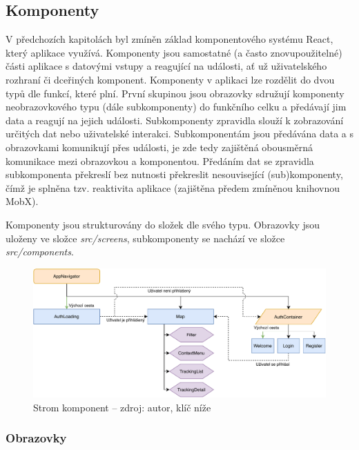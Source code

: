 \subsection{Komponenty}

V předchozích kapitolách byl zmíněn základ komponentového systému React, který aplikace využívá. Komponenty jsou samostatné (a často znovupoužitelné) části aplikace s datovými vstupy a reagující na události, ať už uživatelského rozhraní či dceřiných komponent. Komponenty v aplikaci lze rozdělit do dvou typů dle funkcí, které plní. První skupinou jsou obrazovky sdružují komponenty neobrazovkového typu (dále subkomponenty) do funkčního celku a předávají jim data a reagují na jejich události. Subkomponenty zpravidla slouží k zobrazování určitých dat nebo uživatelské interakci. Subkomponentám jsou předávána data a s obrazovkami komunikují přes události, je zde tedy zajištěná obousměrná komunikace mezi obrazovkou a komponentou. Předáním dat se zpravidla subkomponenta překreslí bez nutnosti překreslit nesouvisející (sub)komponenty, čímž je splněna tzv. reaktivita aplikace (zajištěna předem zmíněnou knihovnou MobX).

Komponenty jsou strukturovány do složek dle svého typu. Obrazovky jsou uloženy ve složce \emph{src/screens}, subkomponenty se nachází ve složce \emph{src/components}.

\begin{figure}[H]
	\begin{center}
		\includegraphics[width=145mm]{img/components.pdf}
	\end{center}
	\caption[Strom komponent]{Strom komponent -- zdroj: autor, klíč níže}
	\label{componenttree}
\end{figure}

\subsubsection{Obrazovky}

